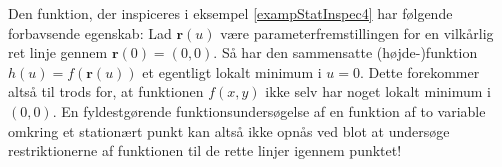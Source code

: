 \begin{aha}
Den funktion, der inspiceres i eksempel \ref{exampStatInspec4} har følgende forbavsende egenskab: Lad $\mathbf{r}(u)$ være parameterfremstillingen for en vilkårlig ret linje gennem $\mathbf{r}(0) = (0,0)$. Så har den sammensatte (højde-)funktion $h(u) = f(\mathbf{r}(u))$ et egentligt lokalt minimum i $u=0$. Dette forekommer altså til trods for, at funktionen $f(x,y)$ ikke selv har noget lokalt minimum i $(0,0)$. En fyldestgørende funktionsundersøgelse af en funktion af to variable omkring et stationært punkt kan altså ikke opnås ved blot at undersøge restriktionerne af funktionen til de rette  linjer igennem punktet!
\end{aha}






